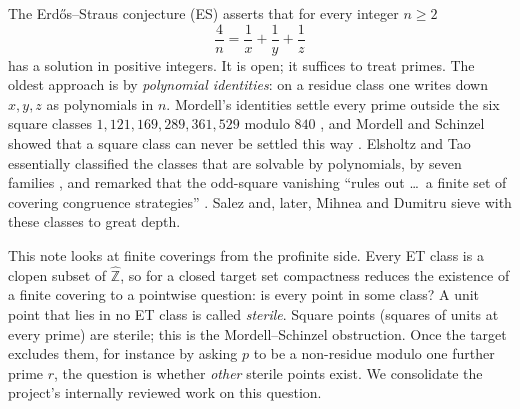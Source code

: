 \documentclass[11pt,reqno]{amsart}
\theoremstyle{definition}
\newcommand{\Z}{\mathbb Z}
\newcommand{\Zh}{\widehat{\Z}}
\begin{document}
The Erd\H{o}s--Straus conjecture (ES) asserts that for every integer
$n\ge2$
\begin{equation}\label{eq:ES}
 \frac4n=\frac1x+\frac1y+\frac1z
\end{equation}
has a solution in positive integers.  It is open; it suffices to treat
primes.  The oldest approach is by \emph{polynomial identities}: on a
residue class one writes down $x,y,z$ as polynomials in $n$.  Mordell's
identities settle every prime outside the six square classes
$1,121,169,289,361,529$ modulo $840$ \cite{Mordell}, and Mordell and
Schinzel showed that a square class can never be settled this way
\cite{Mordell,Schinzel}.  Elsholtz and Tao essentially classified the classes
that are solvable by polynomials, by seven families \cite[Prop.~1.9]{ET}, and
remarked that the odd-square vanishing ``rules out \dots\ a finite set of
covering congruence strategies'' \cite[p.~6]{ET}.  Salez \cite{Salez}
and, later, Mihnea and Dumitru \cite{MD} sieve with these classes to great depth.

This note looks at finite coverings from the profinite side.  Every ET
class is a clopen subset of $\Zh$, so for a closed target set compactness
reduces the existence of a finite covering to a pointwise question: is
every point in some class?  A unit point that lies in no ET class is
called \emph{sterile}.  Square points (squares of units at every prime)
are sterile; this is the Mordell--Schinzel obstruction.  Once the target
excludes them, for instance by asking $p$ to be a non-residue modulo one
further prime $r$, the question is whether \emph{other} sterile points
exist.  We consolidate the project's internally reviewed work on this
question.
\end{document}

